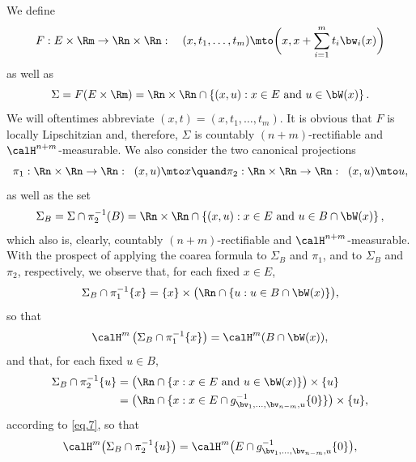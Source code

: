 \begin{Empty}
\label{fibration.1}
We define
\begin{equation*}
F: E \times \Rm \to \Rn \times \Rn:\quad (x,t_1,\ldots,t_m) \mto\biggl(x, x + \sum_{i=1}^m t_i \bw_i(x) \biggr)
\end{equation*}
as well as
\begin{equation*}
\Sigma = F(E \times \Rm) = \Rn \times \Rn \cap \left\{ (x,u): x \in E \text{ and } u \in \bW(x) \right\}.
\end{equation*}
We will oftentimes abbreviate $(x,t)=(x,t_1,\ldots,t_m)$.
It is obvious that $F$ is locally Lipschitzian and, therefore, $\Sigma$ is countably $(n+m)$-rectifiable and $\calH^{n+m}$-measurable.
We also consider the two canonical projections
\begin{equation*}
\pi_1: \Rn \times \Rn \to \Rn:\;\; (x,u) \mto x \quand \pi_2: \Rn \times \Rn \to \Rn:\;\; (x,u) \mto u,
\end{equation*}
as well as the set
\begin{equation*}
\Sigma_B = \Sigma \cap \pi_2^{-1}(B) = \Rn \times \Rn \cap \left\{ (x,u): x \in E \text{ and } u \in B \cap \bW(x) \right\},
\end{equation*}
which also is, clearly, countably $(n+m)$-rectifiable and $\calH^{n+m}$-measurable.
With the prospect of applying the coarea formula to $\Sigma_B$ and $\pi_1$, and to $\Sigma_B$ and $\pi_2$, respectively, we observe that, for each fixed $x \in E$,
\begin{equation*}
\Sigma_B \cap \pi_1^{-1}\{x\} = \{x\} \times \big(\Rn \cap \{ u: u \in B \cap \bW(x) \}\big),
\end{equation*}
so that
\begin{equation}
\label{eq.6}
\calH^m \left(\Sigma_B \cap \pi_1^{-1}\{x\} \right) = \calH^m(B \cap \bW(x)),
\end{equation}
and that, for each fixed $u \in B$,
\begin{equation*}
\begin{split}
\Sigma_B \cap \pi_2^{-1}\{u\} & = \big(\Rn \cap \{ x: x \in E \text{ and } u \in \bW(x) \} \big)\times \{u\}\\
& = \bigl(\Rn\cap\{ x: x \in E \cap g_{\bv_1,\ldots,\bv_{n-m},u}^{-1}\{0\}\} \bigr) \times \{u\},
\end{split}
\end{equation*}
according to \eqref{eq.7}, so that
\begin{equation}
\label{eq.8}
\calH^m \bigl(\Sigma_B \cap \pi_2^{-1}\{u\}\bigr) = \calH^m \bigl(E \cap g_{\bv_1,\ldots,\bv_{n-m},u}^{-1}\{0\}\bigr),

\end{equation}
\end{Empty}

